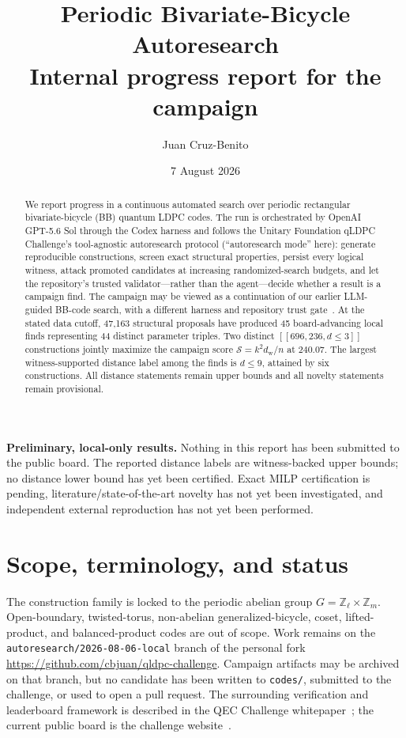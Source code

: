 \documentclass[11pt]{article}
\title{\textbf{Periodic Bivariate-Bicycle Autoresearch}\\[3pt]
       \large Internal progress report for the
       \pathcode{2026-08-06-periodic-bb} campaign}
\author{Juan Cruz-Benito}
\date{7 August 2026}
\newcommand{\dw}{d_{\mathrm w}}
\newcommand{\score}{\mathcal{S}}
\newcommand{\qcode}[3]{\ensuremath{[\![#1,#2,d\!\leq\!#3]\!]}}
\newcommand{\pathcode}[1]{\nolinkurl{#1}}
\begin{document}
\maketitle

\noindent
\colorbox{cautionwash}{%
  \parbox{\dimexpr\linewidth-2\fboxsep\relax}{%
  \textbf{Preliminary, local-only results.}
  Nothing in this report has been submitted to the public board.  The
  reported distance labels are witness-backed upper bounds; no distance lower
  bound has yet been certified.  Exact MILP certification is pending,
  literature/state-of-the-art novelty has not yet been investigated, and
  independent external reproduction has not yet been performed.}}

\begin{abstract}
We report progress in a continuous automated search over periodic rectangular
bivariate-bicycle (BB) quantum LDPC codes.  The run is orchestrated by OpenAI
GPT-5.6 Sol through the Codex harness and follows the Unitary Foundation qLDPC
Challenge's tool-agnostic autoresearch protocol (``autoresearch mode'' here):
generate reproducible constructions, screen exact
structural properties, persist every logical witness, attack promoted
candidates at increasing randomized-search budgets, and let the repository's
trusted validator---rather than the agent---decide whether a result is a
campaign find.  The campaign may be viewed as a continuation of our earlier
LLM-guided BB-code search, with a different harness and repository trust
gate~\cite{cruzbenito2026}.  At the stated data cutoff, 47,163 structural
proposals have produced 45 board-advancing local finds representing 44
distinct parameter triples.
Two distinct \qcode{696}{236}{3} constructions jointly maximize the campaign
score $\score=k^2\dw/n$ at $240.07$.  The largest witness-supported distance
label among the finds is $d\leq9$, attained by six constructions.  All
distance statements remain upper bounds and all novelty statements remain
provisional.
\end{abstract}

\section{Scope, terminology, and status}

The construction family is locked to the periodic abelian group
$G=\mathbb{Z}_{\ell}\times\mathbb{Z}_m$.  Open-boundary, twisted-torus,
non-abelian generalized-bicycle, coset, lifted-product, and balanced-product
codes are out of scope.  Work remains on the
\pathcode{autoresearch/2026-08-06-local} branch of the personal fork
\url{https://github.com/cbjuan/qldpc-challenge}.  Campaign artifacts may be
archived on that branch, but no candidate has been written to \pathcode{codes/},
submitted to the challenge, or used to open a pull request.
The surrounding verification and leaderboard framework is described in the
QEC Challenge whitepaper~\cite{qecwhitepaper}; the current public board is the
challenge website~\cite{qecwebsite}.
\end{document}
